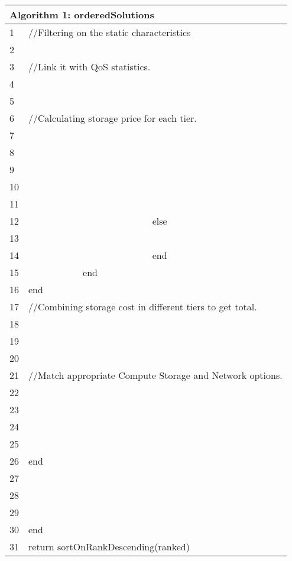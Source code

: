 \documentclass[journal]{IEEEtran}
\begin{document}
\begin{table*}[!ht]
\begin{center}
\begin{tabular}{l l l l l}
\multicolumn{5}{l}{ Algorithm 1: orderedSolutions  } \\
\hline  
1 & \multicolumn{4}{l}{//Filtering on the static characteristics}\\
2 & \multicolumn{4}{l}{}\\

3 & \multicolumn{4}{l}{//Link it with QoS statistics.}\\
4 & \multicolumn{4}{l}{}\\

5 & \multicolumn{4}{l}{}\\

6 & \multicolumn{4}{l}{//Calculating storage price for each tier.}\\
7 & \multicolumn{4}{l}{}\\
8 & \multicolumn{4}{l}{}\\
9 &  & \multicolumn{3}{l}{}\\
10 &  &  & \multicolumn{2}{l}{}\\
11 &  &  &  & \multicolumn{1}{l}{}\\
12 &  &  & \multicolumn{2}{l}{else}\\
13 &  &  &  & \multicolumn{1}{l}{}\\

14 &  &  & \multicolumn{2}{l}{end}\\
15 &  & \multicolumn{2}{l}{end}\\
16 & \multicolumn{4}{l}{end}\\

17 & \multicolumn{4}{l}{//Combining storage cost in different tiers to get total.}\\
18 & \multicolumn{4}{l}{}\\
19 & \multicolumn{4}{l}{}\\
20 & \multicolumn{4}{l}{ }\\

21 & \multicolumn{4}{l}{//Match appropriate Compute Storage and Network options.}\\
22 & \multicolumn{4}{l}{ }\\

23 & \multicolumn{4}{l}{}\\
24 & \multicolumn{4}{l}{}\\
25 &  & \multicolumn{3}{l}{}\\
26 & \multicolumn{4}{l}{end}\\
27 & \multicolumn{4}{l}{}\\
28 & \multicolumn{4}{l}{}\\
29 &  & \multicolumn{3}{l}{ }\\
30 & \multicolumn{4}{l}{end}\\
31 & \multicolumn{4}{l}{return sortOnRankDescending(ranked)}\\

\hline
\end{tabular}
\end{center}
\end{table*}
\end{document}
